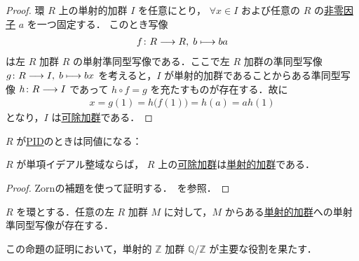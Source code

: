 \documentclass[algtopo_main]{subfiles}
\begin{document}
\begin{proof}
    環 $R$ 上の単射的加群 $I$ を任意にとり，
    $\forall x \in I$ および任意の $R$ の\hyperref[def:non-zero-diviser]{非零因子} $a$ を一つ固定する．
    このとき写像
    \begin{align}
        f \colon R \longrightarrow R,\; b \longmapsto ba
    \end{align}
    は左 $R$ 加群 $R$ の単射準同型写像である．ここで左 $R$ 加群の準同型写像 $g \colon R \longrightarrow I,\; b \longmapsto bx$ 
    を考えると，$I$ が単射的加群であることからある準同型写像 $h \colon R \longrightarrow I$ であって $h \circ f = g$ を充たすものが存在する．故に
    \begin{align}
        x = g(1) = h \bigl( f(1) \bigr) = h(a) = a h(1)
    \end{align}
    となり，$I$ は\hyperref[def:divisable-mod]{可除加群}である．
\end{proof}

$R$ が\hyperref[def:PID]{PID}のときは同値になる：

\begin{myprop}[label=prop:PID-inj-divisable]{}
    $R$ が単項イデアル整域ならば，
    $R$ 上の\hyperref[def:divisable-mod]{可除加群}は\hyperref[def:inj-mod]{単射的加群}である．
\end{myprop}

\begin{proof}
    Zornの補題を使って証明する．~\cite[命題1.98]{Shiho}を参照．
\end{proof}

\begin{myprop}[label=prop:inj-mod-injection]{}
    $R$ を環とする．任意の左 $R$ 加群 $M$ に対して，$M$ からある\hyperref[def:inj-mod]{単射的加群}への単射準同型写像が存在する．
\end{myprop}

この命題の証明において，単射的 $\mathbb{Z}$ 加群 $\mathbb{Q} / \mathbb{Z}$ が主要な役割を果たす．
\end{document}
